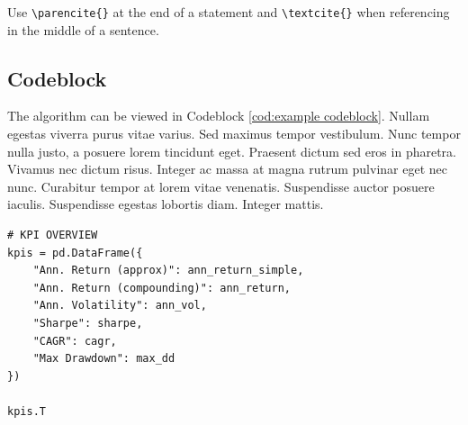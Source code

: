 \noindent Use \verb|\parencite{}| at the end of a statement and \verb|\textcite{}| when referencing in the middle of a sentence.
\subsection{Codeblock}
The algorithm can be viewed in Codeblock \ref{cod:example codeblock}. Nullam egestas viverra purus vitae varius. Sed maximus tempor vestibulum. Nunc tempor nulla justo, a posuere lorem tincidunt eget. Praesent dictum sed eros in pharetra. Vivamus nec dictum risus. Integer ac massa at magna rutrum pulvinar eget nec nunc. Curabitur tempor at lorem vitae venenatis. Suspendisse auctor posuere iaculis. Suspendisse egestas lobortis diam. Integer mattis.

\begin{codeblock}
\caption{Example Codeblock}
\vspace{-16pt}
\begin{verbatim}
# KPI OVERVIEW
kpis = pd.DataFrame({
    "Ann. Return (approx)": ann_return_simple,
    "Ann. Return (compounding)": ann_return,
    "Ann. Volatility": ann_vol,
    "Sharpe": sharpe,
    "CAGR": cagr,
    "Max Drawdown": max_dd
})

kpis.T
\end{verbatim}
\label{cod:example codeblock}
\end{codeblock}